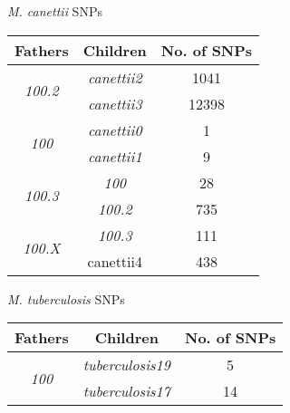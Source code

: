 \documentclass[runningheads,a4paper]{llncs}
\begin{document}
\begin{table}[!htb]
    \begin{minipage}{.5\linewidth}
    \tiny
      \centering
      \textit{M. canettii} SNPs\\
        \begin{tabular}{|c|c|c|}
        \hline
        \textbf{Fathers}                & \textbf{Children}  & \textbf{No. of SNPs} \\ \hline
        \multirow{2}{*}{\textit{100.2}} & \textit{canettii2} & 1041                   \\ %
                                & \textit{canettii3}  & 12398                  \\ \hline
        \multirow{2}{*}{\textit{100}}   & \textit{canettii0}  & 1                   \\ %
                                & \textit{canettii1}  & 9                   \\ \hline
        \multirow{2}{*}{\textit{100.3}} & \textit{100}       & 28                   \\ %
                                & \textit{100.2}     & 735                   \\ \hline
        \multirow{2}{*}{\textit{100.X}} & \textit{100.3}     & 111                   \\ %
                                & canettii4          & 438                  \\ \hline
      \end{tabular}
    \end{minipage}%
    \begin{minipage}{.5\linewidth}
      \centering
      \tiny
        \textit{M. tuberculosis} SNPs\\        \begin{tabular}{|c|c|c|}
          \hline
           \textbf{Fathers}                & \textbf{Children}  & \textbf{No. of SNPs} \\ \hline
           \multirow{2}{*}{\textit{100}} & \textit{tuberculosis19} & 5                   \\ %
                                & \textit{tuberculosis17}  & 14                 \\ \hline
           

\end{tabular}
\end{minipage}
\end{table}
\end{document}
